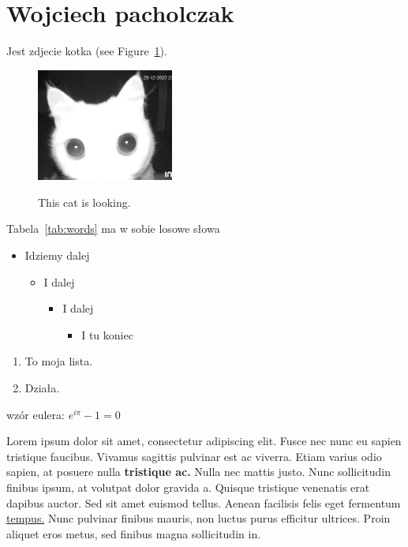 \section{Wojciech pacholczak}

Jest zdjecie kotka (see Figure~\ref{fig:cat}).


\begin{figure}[htbp]
\centering
\includegraphics[width=0.4\textwidth]{pictures/bigEyedCat.jpg} \
\caption{This cat is looking.}
\label{fig:cat}
\end{figure}

Tabela~\ref{tab:words} ma w sobie losowe słowa



\begin{itemize}
   \item Idziemy dalej
   \begin{itemize}
     \item I dalej
     \begin{itemize}
       \item I dalej
       \begin{itemize}
         \item I tu koniec
       \end{itemize}
     \end{itemize}
   \end{itemize}
 \end{itemize}


\begin{enumerate}
  \item To moja lista.
  \item Działa.
\end{enumerate}


wzór eulera:
$e^{i\pi} - 1 = 0$
\vspace{0.5cm}

 Lorem ipsum dolor sit amet, consectetur adipiscing elit. Fusce nec nunc eu sapien tristique faucibus. Vivamus sagittis pulvinar est ac viverra. Etiam varius odio sapien, at posuere nulla \textbf{tristique ac.} Nulla nec mattis justo. Nunc sollicitudin finibus ipsum, at volutpat dolor gravida a. Quisque tristique venenatis erat dapibus auctor. Sed sit amet euismod tellus. Aenean facilisis felis eget fermentum \underline{tempus.}  Nunc pulvinar finibus mauris, non luctus purus efficitur ultrices. Proin aliquet eros metus, sed finibus magna sollicitudin in.


